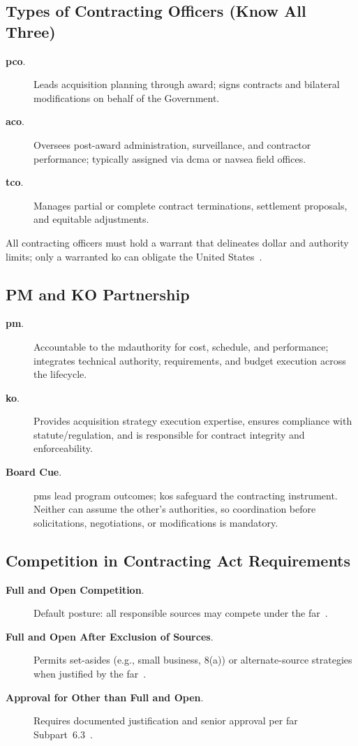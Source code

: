 \documentclass[../main.tex]{subfiles}
\begin{document}
\subsection{Types of Contracting Officers (Know All Three)}
\begin{description}
  \item[\textbf{\ac{pco}}.] Leads acquisition planning through award; signs contracts and bilateral modifications on behalf of the Government.
  \item[\textbf{\ac{aco}}.] Oversees post-award administration, surveillance, and contractor performance; typically assigned via \ac{dcma} or \ac{navsea} field offices.
  \item[\textbf{\ac{tco}}.] Manages partial or complete contract terminations, settlement proposals, and equitable adjustments.
\end{description}
All contracting officers must hold a warrant that delineates dollar and authority limits; only a warranted \ac{ko} can obligate the United States~\autocite{FAR}.

\subsection{PM and KO Partnership}
\begin{description}
  \item[\textbf{\ac{pm}}.] Accountable to the \ac{mdauthority} for cost, schedule, and performance; integrates technical authority, requirements, and budget execution across the lifecycle.
  \item[\textbf{\ac{ko}}.] Provides acquisition strategy execution expertise, ensures compliance with statute/regulation, and is responsible for contract integrity and enforceability.
  \item[\textbf{Board Cue}.] \acp{pm} lead program outcomes; \acp{ko} safeguard the contracting instrument. Neither can assume the other's authorities, so coordination before solicitations, negotiations, or modifications is mandatory.
\end{description}

\subsection{Competition in Contracting Act Requirements}
\begin{description}
\item[\textbf{Full and Open Competition}.] Default posture: all responsible sources may compete under the \ac{far}~\autocite{USC-3201-CICA,FAR}.
\item[\textbf{Full and Open After Exclusion of Sources}.] Permits set-asides (e.g., small business, 8(a)) or alternate-source strategies when justified by the \ac{far}~\autocite{FAR}.
  \item[\textbf{Approval for Other than Full and Open}.] Requires documented justification and senior approval per \ac{far} Subpart~6.3~\autocite[Subpart~6.3]{FAR}.
\end{description}
\end{document}
